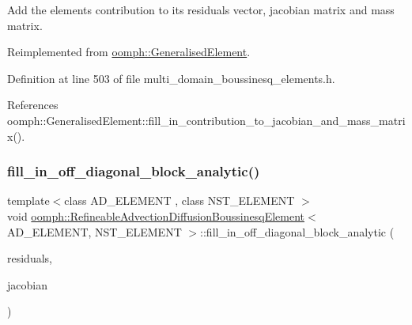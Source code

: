 Add the element\textquotesingle{}s contribution to its residuals vector, jacobian matrix and mass matrix. 



Reimplemented from \hyperlink{classoomph_1_1GeneralisedElement_a2b6294a730647cf865da94f2531466f8}{oomph\+::\+Generalised\+Element}.



Definition at line 503 of file multi\+\_\+domain\+\_\+boussinesq\+\_\+elements.\+h.



References oomph\+::\+Generalised\+Element\+::fill\+\_\+in\+\_\+contribution\+\_\+to\+\_\+jacobian\+\_\+and\+\_\+mass\+\_\+matrix().

\mbox{\label{classoomph_1_1RefineableAdvectionDiffusionBoussinesqElement_ac787480832d09daf1bd1f14715dc6820}} 
\subsubsection{\texorpdfstring{fill\+\_\+in\+\_\+off\+\_\+diagonal\+\_\+block\+\_\+analytic()}{fill\_in\_off\_diagonal\_block\_analytic()}}
{\footnotesize\ttfamily template$<$class A\+D\+\_\+\+E\+L\+E\+M\+E\+NT , class N\+S\+T\+\_\+\+E\+L\+E\+M\+E\+NT $>$ \\
void \hyperlink{classoomph_1_1RefineableAdvectionDiffusionBoussinesqElement}{oomph\+::\+Refineable\+Advection\+Diffusion\+Boussinesq\+Element}$<$ A\+D\+\_\+\+E\+L\+E\+M\+E\+NT, N\+S\+T\+\_\+\+E\+L\+E\+M\+E\+NT $>$\+::fill\+\_\+in\+\_\+off\+\_\+diagonal\+\_\+block\+\_\+analytic (\begin{DoxyParamCaption}\item[{\hyperlink{classoomph_1_1Vector}{Vector}$<$ double $>$ \&}]{residuals,  }\item[{\hyperlink{classoomph_1_1DenseMatrix}{Dense\+Matrix}$<$ double $>$ \&}]{jacobian }\end{DoxyParamCaption})\hspace{0.3cm}{\ttfamily [inline]}}



